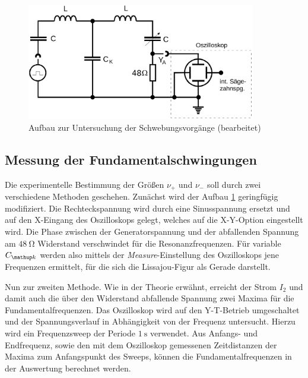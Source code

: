 \begin{figure}
  \centering
  \includegraphics[width = 10cm]{pics/aufbau_schwebung.png}
  \caption{Aufbau zur Untersuchung der Schwebungsvorgänge \cite{anleitung355} (bearbeitet)}
  \label{fig: schwebung}
\end{figure}

\subsection{Messung der Fundamentalschwingungen}
Die experimentelle Bestimmung der Größen $\nu_+$ und $\nu_-$ soll durch zwei verschiedene Methoden geschehen. Zunächst wird der Aufbau \ref{fig: schwebung}
geringfügig modifiziert. Die Rechteckspannung wird durch eine Sinusspannung ersetzt und auf den X-Eingang des Oszilloskops gelegt, welches auf die X-Y-Option
eingestellt wird. Die Phase zwischen der Generatorspannung und der abfallenden Spannung am $\SI{48}{\ohm}$ Widerstand verschwindet für die Resonanzfrequenzen.
Für variable $C\ua{k}$ werden also mittels der \emph{Measure}-Einstellung des Oszilloskops jene Frequenzen ermittelt, für die sich die Lissajou-Figur als Gerade darstellt.\par %
Nun zur zweiten Methode. Wie in der Theorie erwähnt, erreicht der Strom $I_2$ und damit auch die über den Widerstand abfallende Spannung zwei Maxima für die Fundamentalfrequenzen.
Das Oszilloskop wird auf den Y-T-Betrieb umgeschaltet und der Spannungsverlauf in Abhängigkeit von der Frequenz untersucht. Hierzu wird ein Frequenzsweep
der Periode $\SI{1}{\second}$ verwendet. Aus Anfangs- und Endfrequenz, sowie den mit dem Oszilloskop gemessenen Zeitdistanzen der Maxima zum Anfangspunkt
des Sweeps, können die Fundamentalfrequenzen in der Auswertung berechnet werden.
\newpage
